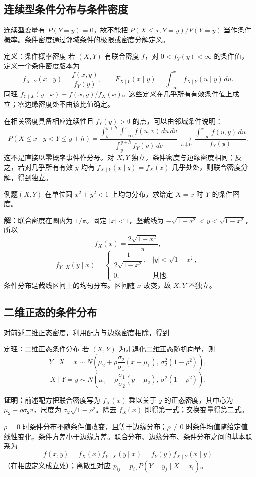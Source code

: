 \documentclass[UTF8,fontset=none,zihao=-4,a4paper]{ctexart}
\newcommand{\example}[1]{\begin{infobox}{例题}#1\end{infobox}}
\newcommand{\solution}{\par\noindent\textbf{解：}}
\newcommand{\proof}{\par\noindent\textbf{证明：}}
\begin{document}
\subsection{连续型条件分布与条件密度}
连续型变量有 $P(Y=y)=0$，故不能把 $P(X\le x,Y=y)/P(Y=y)$ 当作条件概率。条件密度通过邻域条件的极限或密度分解定义。
\begin{infobox}{定义：条件概率密度}
若 $(X,Y)$ 有联合密度 $f$，对 $0<f_Y(y)<\infty$ 的条件值，定义一个条件密度版本为
\[
f_{X\mid Y}(x\mid y)=\frac{f(x,y)}{f_Y(y)},\qquad
F_{X\mid Y}(x\mid y)=\int_{-\infty}^x f_{X\mid Y}(u\mid y)\,du.
\]
同理 $f_{Y\mid X}(y\mid x)=f(x,y)/f_X(x)$。这些定义在几乎所有有效条件值上成立；零边缘密度处不由该比值确定。
\end{infobox}
在相关密度具备相应连续性且 $f_Y(y)>0$ 的点，可以由邻域条件说明：
\[
P(X\le x\mid y<Y\le y+h)
=\frac{\int_y^{y+h}\int_{-\infty}^x f(u,v)\,du\,dv}
{\int_y^{y+h}f_Y(v)\,dv}
\ \xrightarrow[h\downarrow0]{}\
\frac{\int_{-\infty}^x f(u,y)\,du}{f_Y(y)}.
\]
这不是直接以零概率事件作分母。对 $X,Y$ 独立，条件密度与边缘密度相同；反之，若对几乎所有有效 $y$ 均有 $f_{X\mid Y}(x\mid y)=f_X(x)$ 几乎处处，则联合密度分解，得到独立。
\example{$(X,Y)$ 在单位圆 $x^2+y^2<1$ 上均匀分布，求给定 $X=x$ 时 $Y$ 的条件密度。}
\solution 联合密度在圆内为 $1/\pi$。固定 $|x|<1$，竖截线为 $-\sqrt{1-x^2}<y<\sqrt{1-x^2}$，所以
\[
f_X(x)=\frac{2\sqrt{1-x^2}}{\pi},
\]
\[
f_{Y\mid X}(y\mid x)=\begin{cases}
\dfrac1{2\sqrt{1-x^2}},&|y|<\sqrt{1-x^2},\\0,&\text{其他}.
\end{cases}
\]
条件分布是截线区间上的均匀分布。区间随 $x$ 改变，故 $X,Y$ 不独立。
\subsection{二维正态的条件分布}
对前述二维正态密度，利用配方与边缘密度相除，得到
\begin{infobox}{定理：二维正态条件分布}
若 $(X,Y)$ 为非退化二维正态随机向量，则
\[
Y\mid X=x\sim
N\left(\mu_2+\rho\frac{\sigma_2}{\sigma_1}(x-\mu_1),\ 
\sigma_2^2(1-\rho^2)\right),
\]
\[
X\mid Y=y\sim
N\left(\mu_1+\rho\frac{\sigma_1}{\sigma_2}(y-\mu_2),\ 
\sigma_1^2(1-\rho^2)\right).
\]
\end{infobox}
\proof 前述配方把联合密度写为 $f_X(x)$ 乘以关于 $y$ 的正态密度，其中心为 $\mu_2+\rho\sigma_2u$，尺度为 $\sigma_2\sqrt{1-\rho^2}$。除去 $f_X(x)$ 即得第一式；交换变量得第二式。

$\rho=0$ 时条件分布不随条件值改变，且等于边缘分布；$\rho\ne0$ 时条件均值随给定值线性变化，条件方差小于边缘方差。联合分布、边缘分布、条件分布之间的基本联系为
\[
f(x,y)=f_X(x)f_{Y\mid X}(y\mid x)
=f_Y(y)f_{X\mid Y}(x\mid y)
\]
（在相应定义成立处）；离散型对应 $p_{ij}=p_{i\cdot}P(Y=y_j\mid X=x_i)$。
\end{document}
